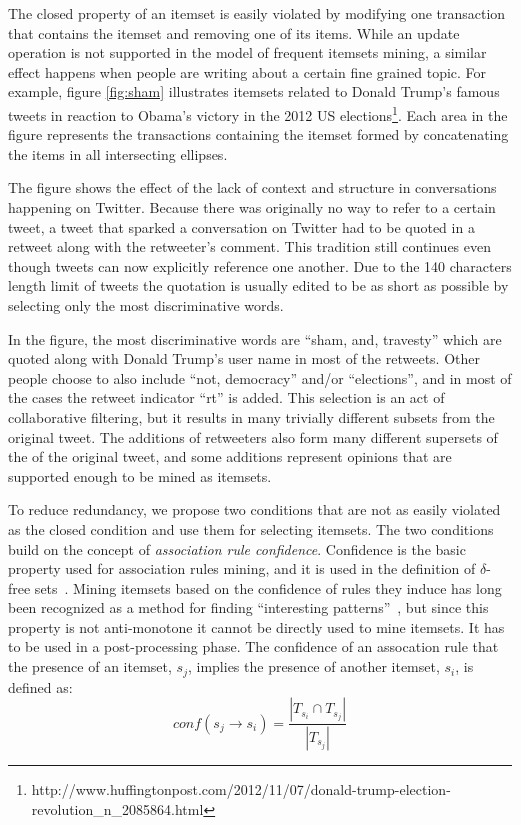 \documentclass[letterpaper,12pt,titlepage,oneside,final]{book}
\begin{document}
The closed property of an itemset is easily violated by modifying one
transaction that contains the itemset and removing one of its items.
While an update operation is not supported in the model of frequent itemsets
mining, a similar effect happens when people are writing about a certain fine
grained topic.
For example, figure \ref{fig:sham} illustrates  itemsets related to Donald
Trump's famous tweets in reaction to Obama's victory in the
2012 US elections\footnote{http://www.huffingtonpost.com/2012/11/07/donald-trump-election-revolution\_n\_2085864.html}.  
Each area in the figure represents the transactions containing the itemset
formed by concatenating the items in all intersecting ellipses.  

The figure shows the effect of the lack of context and structure in
conversations happening on Twitter.
Because there was originally no way to refer to a certain tweet,
a tweet that sparked a conversation on Twitter had to be quoted in a retweet
along with the retweeter's comment.
This tradition still continues even though tweets can now explicitly reference
one another. 
Due to the 140 characters length limit of tweets the quotation is usually 
edited to be as short as possible by selecting only the most discriminative
words. 

In the figure, the most discriminative words are ``sham, and, travesty''
which are quoted along with Donald Trump's user name in most of the retweets.
Other people choose to also include ``not, democracy'' and/or ``elections'',
and in most of the cases the retweet indicator ``rt'' is added. 
This selection is an act of collaborative filtering,
but it results in many trivially different subsets from the original tweet.
The additions of retweeters also form many different supersets of the of the
original tweet, and some additions represent opinions that are supported
enough to be mined as itemsets. 

To reduce redundancy, we propose two conditions that are not as easily violated 
as the closed condition and use them for selecting itemsets.
The two conditions build on the concept of \emph{association rule confidence}.
Confidence is the basic property used for association rules mining,
and it is used in the definition of $\delta$-free sets~\cite{boulicaut2003free}.
Mining itemsets based on the confidence of rules they induce has long been
recognized as a method for finding
``interesting patterns''~\cite{cohen2001finding},
but since this property is not anti-monotone it cannot be directly used
to mine itemsets. It has to be used in a post-processing phase.
The confidence of an assocation rule that the presence of an itemset,
$s_{j}$, implies the presence of another itemset, $s_i$, is  defined as:
\begin{equation}\label{eq:conf}conf(s_j \rightarrow s_i) = \frac{|T_{s_i} \cap T_{s_j}|}{|T_{s_j}|}\end{equation}
\end{document}
